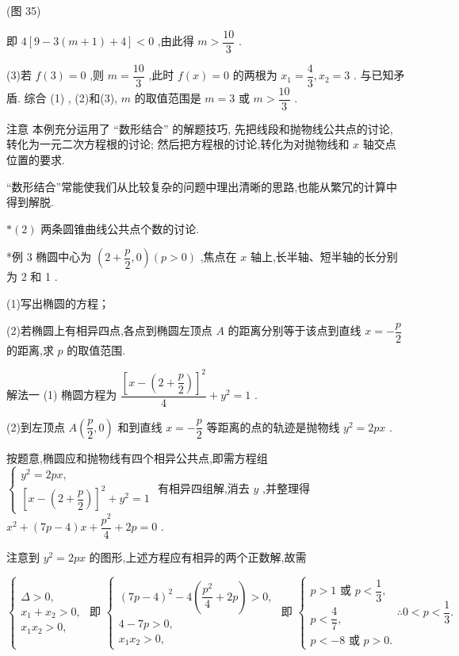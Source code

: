 (图 35)

即 $4\left\lbrack  {9 - 3\left( {m + 1}\right)  + 4}\right\rbrack   < 0$ ,由此得 $m > \dfrac{10}{3}$ .

(3)若 $f\left( 3\right)  = 0$ ,则 $m = \dfrac{10}{3}$ ,此时 $f\left( x\right)  = 0$ 的两根为 ${x}_{1} = \dfrac{4}{3},{x}_{2} = 3$ . 与已知矛盾. 综合 (1) , (2)和(3), $m$ 的取值范围是 $m = 3$ 或 $m > \dfrac{10}{3}$ .

注意 本例充分运用了 “数形结合” 的解题技巧, 先把线段和抛物线公共点的讨论, 转化为一元二次方程根的讨论; 然后把方程根的讨论,转化为对抛物线和 $x$ 轴交点位置的要求.

“数形结合”常能使我们从比较复杂的问题中理出清晰的思路,也能从繁冗的计算中得到解脱.

$* \left( 2\right)$ 两条圆锥曲线公共点个数的讨论.

*例 3 椭圆中心为 $\left( {2 + \dfrac{p}{2},0}\right) \left( {p > 0}\right)$ ,焦点在 $x$ 轴上,长半轴、短半轴的长分别为 2 和 1 .

(1)写出椭圆的方程；

(2)若椭圆上有相异四点,各点到椭圆左顶点 $A$ 的距离分别等于该点到直线 $x =  - \dfrac{p}{2}$ 的距离,求 $p$ 的取值范围.

解法一 (1) 椭圆方程为 $\dfrac{{\left\lbrack  x - \left( 2 + \dfrac{p}{2}\right) \right\rbrack  }^{2}}{4} + {y}^{2} = 1$ .

(2)到左顶点 $A\left( {\dfrac{p}{2},0}\right)$ 和到直线 $x =  - \dfrac{p}{2}$ 等距离的点的轨迹是抛物线 ${y}^{2} = {2px}$ .

按题意,椭圆应和抛物线有四个相异公共点,即需方程组 $\left\{  \begin{array}{l} {y}^{2} = {2px}, \\  {\left\lbrack  x - \left( 2 + \dfrac{p}{2}\right) \right\rbrack  }^{2} + {y}^{2} = 1 \end{array}\right.$ 有相异四组解,消去 $y$ ,并整理得 ${x}^{2} + \left( {{7p} - 4}\right) x + \dfrac{{p}^{2}}{4} + {2p} = 0$ .

注意到 ${y}^{2} = {2px}$ 的图形,上述方程应有相异的两个正数解,故需

$\left\{  {\begin{array}{l} \Delta  > 0, \\  {x}_{1} + {x}_{2} > 0, \\  {x}_{1}{x}_{2} > 0, \end{array}\text{ 即 }\left\{  {\begin{array}{l} {\left( 7p - 4\right) }^{2} - 4\left( {\dfrac{{p}^{2}}{4} + {2p}}\right)  > 0, \\  4 - {7p} > 0, \\  {x}_{1}{x}_{2} > 0, \end{array}\text{ 即 }\left\{  {\begin{array}{l} p > 1\text{ 或 }p < \dfrac{1}{3}, \\  p < \dfrac{4}{7}, \\  p <  - 8\text{ 或 }p > 0. \end{array}\therefore 0 < p < \dfrac{1}{3}.}\right. }\right. }\right.$

